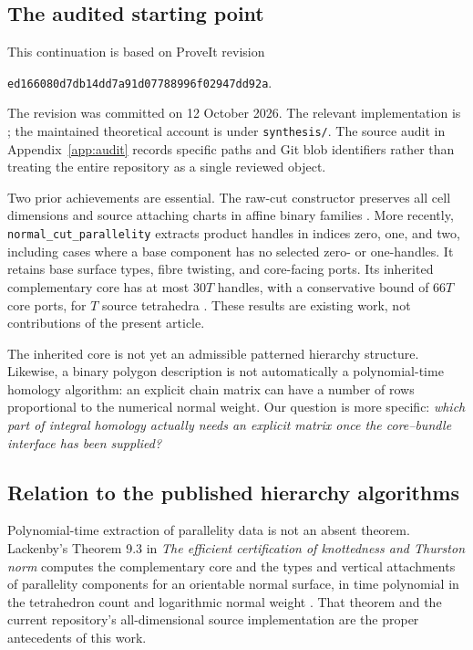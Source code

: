 \documentclass[11pt]{article}
\theoremstyle{definition}
\theoremstyle{remark}
\newcommand{\code}[1]{\texttt{#1}}
\begin{document}
\subsection{The audited starting point}
This continuation is based on ProveIt revision
\begin{center}\small\code{ed166080d7db14dd7a91d07788996f02947dd92a}.\end{center}
The revision was committed on 12 October 2026. The relevant implementation is
; the maintained theoretical account is
under \code{synthesis/}. The source audit in Appendix~\ref{app:audit} records
specific paths and Git blob identifiers rather than treating the entire
repository as a single reviewed object.

Two prior achievements are essential. The raw-cut constructor preserves all
cell dimensions and source attaching charts in affine binary families
\cite{repo-cells}. More recently, \code{normal\_cut\_parallelity} extracts
product handles in indices zero, one, and two, including cases where a base
component has no selected zero- or one-handles. It retains base surface types,
fibre twisting, and core-facing ports. Its inherited complementary core has
at most $30T$ handles, with a conservative bound of $66T$ core ports, for $T$
source tetrahedra \cite{repo-parallelity}. These results are existing work,
not contributions of the present article.

The inherited core is not yet an admissible patterned hierarchy structure.
Likewise, a binary polygon description is not automatically a polynomial-time
homology algorithm: an explicit chain matrix can have a number of rows
proportional to the numerical normal weight. Our question is more specific:
\emph{which part of integral homology actually needs an explicit matrix once
the core--bundle interface has been supplied?}

\subsection{Relation to the published hierarchy algorithms}
Polynomial-time extraction of parallelity data is not an absent theorem.
Lackenby's Theorem 9.3 in \emph{The efficient certification of knottedness and
Thurston norm} computes the complementary core and the types and vertical
attachments of parallelity components for an orientable normal surface, in
time polynomial in the tetrahedron count and logarithmic normal weight
\cite{lackenby-cert}. That theorem and the current repository's all-dimensional
source implementation are the proper antecedents of this work.
\end{document}
